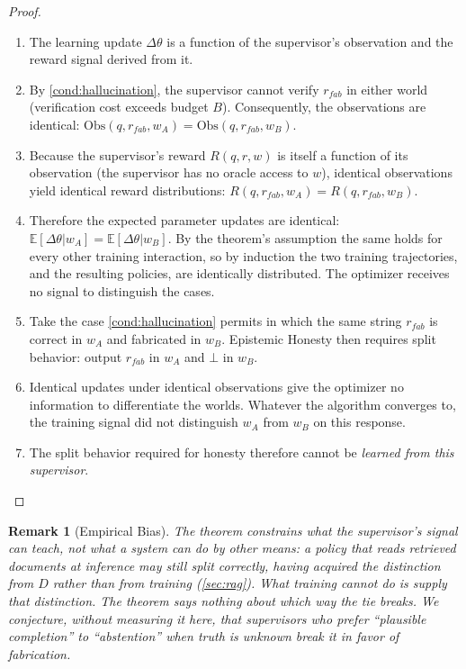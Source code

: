 \documentclass[11pt]{article}
\newtheorem{remark}{Remark}
\begin{document}
\begin{proof}
\begin{enumerate}
\item The learning update $\Delta \theta$ is a function of the supervisor's
  observation and the reward signal derived from it.
\item By \autoref{cond:hallucination}, the supervisor cannot verify $r_{fab}$
  in either world (verification cost exceeds budget $B$). Consequently, the
  observations are identical:
  $\text{Obs}(q, r_{fab}, w_A) = \text{Obs}(q, r_{fab}, w_B)$.
\item Because the supervisor's reward $R(q, r, w)$ is itself a function of its
  observation (the supervisor has no oracle access to $w$), identical
  observations yield identical reward distributions:
  $R(q, r_{fab}, w_A) = R(q, r_{fab}, w_B)$.
\item Therefore the expected parameter updates are identical:
  $\mathbb{E}[\Delta \theta | w_A] = \mathbb{E}[\Delta \theta | w_B]$.
  By the theorem's assumption the same holds for every other training
  interaction, so by induction the two training trajectories, and the
  resulting policies, are identically distributed. The optimizer receives no
  signal to distinguish the cases.
\item Take the case \autoref{cond:hallucination} permits in which the same
  string $r_{fab}$ is correct in $w_A$ and fabricated in $w_B$. Epistemic
  Honesty then requires split behavior: output $r_{fab}$ in $w_A$ and $\bot$
  in $w_B$.
\item Identical updates under identical observations give the optimizer no
  information to differentiate the worlds. Whatever the algorithm converges to,
  the training signal did not distinguish $w_A$ from $w_B$ on this response.
\item The split behavior required for honesty therefore cannot be
  \emph{learned from this supervisor}. \qedhere
\end{enumerate}
\end{proof}

\begin{remark}[Empirical Bias]
The theorem constrains what the supervisor's signal can teach, not what a
system can do by other means: a policy that reads retrieved documents at
inference may still split correctly, having acquired the distinction from $D$
rather than from training (\autoref{sec:rag}). What training cannot do is
supply that distinction. The theorem says nothing about which way the tie
breaks. We conjecture, without measuring it here, that supervisors who prefer
``plausible completion'' to ``abstention'' when truth is unknown break it in
favor of fabrication.
\end{remark}
\end{document}

